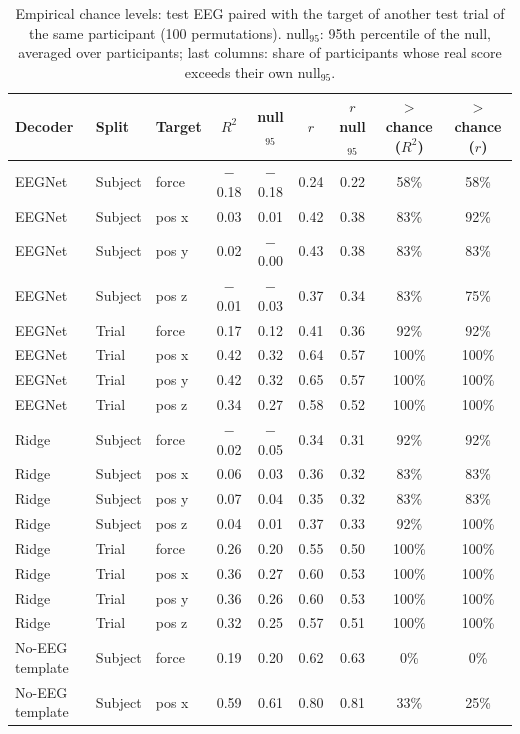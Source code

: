 \begin{table}[t]
\centering
\caption{Empirical chance levels: test EEG paired with the target of another test trial of the same participant (100 permutations). null$_{95}$: 95th percentile of the null, averaged over participants; last columns: share of participants whose real score exceeds their own null$_{95}$.}
\label{tab:chance}
\footnotesize
\setlength{\tabcolsep}{3pt}
\begin{tabular}{lllcccccc}
\toprule
Decoder & Split & Target & $R^2$ & null$_{95}$ & $r$ & $r$ null$_{95}$ & $>$chance ($R^2$) & $>$chance ($r$) \\
\midrule
EEGNet & Subject & force & $-$0.18 & $-$0.18 & 0.24 & 0.22 & 58\% & 58\% \\
EEGNet & Subject & pos x & 0.03 & 0.01 & 0.42 & 0.38 & 83\% & 92\% \\
EEGNet & Subject & pos y & 0.02 & $-$0.00 & 0.43 & 0.38 & 83\% & 83\% \\
EEGNet & Subject & pos z & $-$0.01 & $-$0.03 & 0.37 & 0.34 & 83\% & 75\% \\
EEGNet & Trial & force & 0.17 & 0.12 & 0.41 & 0.36 & 92\% & 92\% \\
EEGNet & Trial & pos x & 0.42 & 0.32 & 0.64 & 0.57 & 100\% & 100\% \\
EEGNet & Trial & pos y & 0.42 & 0.32 & 0.65 & 0.57 & 100\% & 100\% \\
EEGNet & Trial & pos z & 0.34 & 0.27 & 0.58 & 0.52 & 100\% & 100\% \\
Ridge & Subject & force & $-$0.02 & $-$0.05 & 0.34 & 0.31 & 92\% & 92\% \\
Ridge & Subject & pos x & 0.06 & 0.03 & 0.36 & 0.32 & 83\% & 83\% \\
Ridge & Subject & pos y & 0.07 & 0.04 & 0.35 & 0.32 & 83\% & 83\% \\
Ridge & Subject & pos z & 0.04 & 0.01 & 0.37 & 0.33 & 92\% & 100\% \\
Ridge & Trial & force & 0.26 & 0.20 & 0.55 & 0.50 & 100\% & 100\% \\
Ridge & Trial & pos x & 0.36 & 0.27 & 0.60 & 0.53 & 100\% & 100\% \\
Ridge & Trial & pos y & 0.36 & 0.26 & 0.60 & 0.53 & 100\% & 100\% \\
Ridge & Trial & pos z & 0.32 & 0.25 & 0.57 & 0.51 & 100\% & 100\% \\
No-EEG template & Subject & force & 0.19 & 0.20 & 0.62 & 0.63 & 0\% & 0\% \\
No-EEG template & Subject & pos x & 0.59 & 0.61 & 0.80 & 0.81 & 33\% & 25\% \\

\end{tabular}
\end{table}
